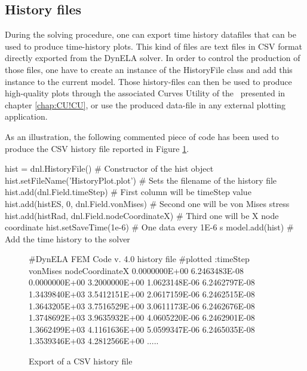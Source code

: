 \subsection{History files}

During the solving procedure, one can export time history datafiles that can be used to produce time-history plots. This kind of files are text files in CSV format directly exported from the DynELA solver. In order to control the production of those files, one have to create an instance of the \textsf{HistoryFile} class and add this instance to the current model. Those history-files can then be used to produce high-quality plots through the associated \textsf{Curves Utility} of the \DynELA~presented in chapter \ref{chap:CU!CU}, or use the produced data-file in any external plotting application.

As an illustration, the following commented piece of code has been used to produce the CSV history file reported in Figure \ref{fig:PL!HF!Export}.
\begin{PythonListing}
hist = dnl.HistoryFile()              # Constructor of the hist object
hist.setFileName('HistoryPlot.plot')  # Sets the filename of the history file
hist.add(dnl.Field.timeStep)                 # First column will be timeStep value
hist.add(histES, 0, dnl.Field.vonMises)      # Second one will be von Mises stress
hist.add(histRad, dnl.Field.nodeCoordinateX) # Third one will be X node coordinate
hist.setSaveTime(1e-6)                       # One data every 1E-6 s
model.add(hist)                              # Add the time history to the solver
\end{PythonListing}

\begin{figure}[h]
\begin{centering}
\begin{BashListing}
#DynELA FEM Code v. 4.0 history file
#plotted :timeStep vonMises nodeCoordinateX
0.0000000E+00 6.2463483E-08 0.0000000E+00 3.2000000E+00
1.0623148E-06 6.2462797E-08 1.3439840E+03 3.5412151E+00
2.0617159E-06 6.2462515E-08 1.3643205E+03 3.7516529E+00
3.0611173E-06 6.2462676E-08 1.3748692E+03 3.9635932E+00
4.0605220E-06 6.2462901E-08 1.3662499E+03 4.1161636E+00
5.0599347E-06 6.2465035E-08 1.3539346E+03 4.2812566E+00
.....
\end{BashListing}
\par\end{centering}
\caption{Export of a CSV history file\label{fig:PL!HF!Export}}
\end{figure}

